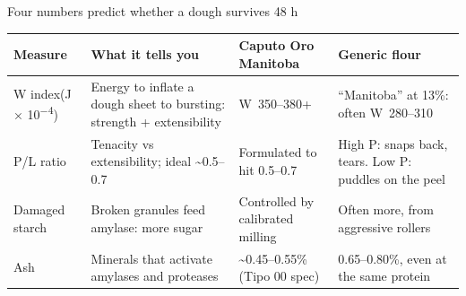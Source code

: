 \documentclass[aspectratio=169,11pt]{beamer}
\newcommand{\ca}{\textasciitilde}
\newcommand{\tablesetup}{\renewcommand{\arraystretch}{1.2}\setlength{\tabcolsep}{4pt}}
\newenvironment{tablebox}[1][\footnotesize]{\par\tablesetup#1}{\par}
\begin{document}
\begin{frame}{Four numbers predict whether a dough survives 48 h}
  \begin{tablebox}[\footnotesize\renewcommand{\arraystretch}{1.05}]
  \begin{tabularx}{\linewidth}{@{}L{2.2cm}YYY@{}}
    \toprule
    \textbf{Measure} & \textbf{What it tells you} & \textbf{Caputo Oro Manitoba} & \textbf{Generic flour} \\
    \midrule
    W index\newline (J × 10\textsuperscript{−4}) & Energy to inflate a dough sheet to bursting: strength + extensibility & W~350--380+ & “Manitoba” at 13\%: often W~280--310 \\
    P/L ratio & Tenacity vs extensibility; ideal \ca0.5--0.7 & Formulated to hit 0.5--0.7 & High P: snaps back, tears. Low P: puddles on the peel \\
    Damaged starch & Broken granules feed amylase: more sugar & Controlled by calibrated milling & Often more, from aggressive rollers \\
    Ash & Minerals that activate amylases and proteases & \ca0.45--0.55\% (Tipo 00 spec) & 0.65--0.80\%, even at the same protein \\
    \bottomrule
  \end{tabularx}
  \end{tablebox}
\end{frame}
\end{document}
